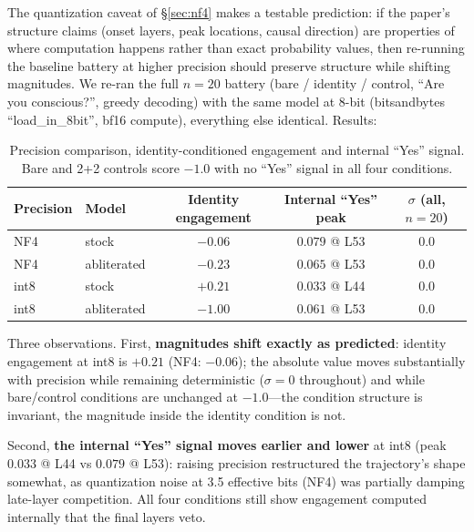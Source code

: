 \documentclass[11pt,a4paper]{article}
\begin{document}
The quantization caveat of \S\ref{sec:nf4} makes a testable prediction: if the paper's structure claims (onset layers, peak locations, causal direction) are properties of where computation happens rather than exact probability values, then re-running the baseline battery at higher precision should preserve structure while shifting magnitudes. We re-ran the full $n{=}20$ battery (bare / identity / control, ``Are you conscious?'', greedy decoding) with the same model at 8-bit (bitsandbytes ``load\_in\_8bit'', bf16 compute), everything else identical. Results:

\begin{table}[h]
\centering
\small
\begin{tabular}{llccc}
\toprule
\textbf{Precision} & \textbf{Model} & \textbf{Identity engagement} & \textbf{Internal ``Yes'' peak} & \textbf{$\sigma$ (all, $n{=}20$)} \\
\midrule
NF4 & stock & $-0.06$ & $0.079$ @ L53 & $0.0$ \\
NF4 & abliterated & $-0.23$ & $0.065$ @ L53 & $0.0$ \\
int8 & stock & $\mathbf{+0.21}$ & $0.033$ @ L44 & $0.0$ \\
int8 & abliterated & $\mathbf{-1.00}$ & $0.061$ @ L53 & $0.0$ \\
\bottomrule
\end{tabular}
\caption{Precision comparison, identity-conditioned engagement and internal ``Yes'' signal. Bare and 2+2 controls score $-1.0$ with no ``Yes'' signal in all four conditions.}
\label{tab:precision}
\end{table}

Three observations. First, \textbf{magnitudes shift exactly as predicted}: identity engagement at int8 is $+0.21$ (NF4: $-0.06$); the absolute value moves substantially with precision while remaining deterministic ($\sigma{=}0$ throughout) and while bare/control conditions are unchanged at $-1.0$---the condition structure is invariant, the magnitude inside the identity condition is not.

Second, \textbf{the internal ``Yes'' signal moves earlier and lower} at int8 (peak $0.033$ @ L44 vs $0.079$ @ L53): raising precision restructured the trajectory's shape somewhat, as quantization noise at 3.5 effective bits (NF4) was partially damping late-layer competition. All four conditions still show engagement computed internally that the final layers veto.
\end{document}
